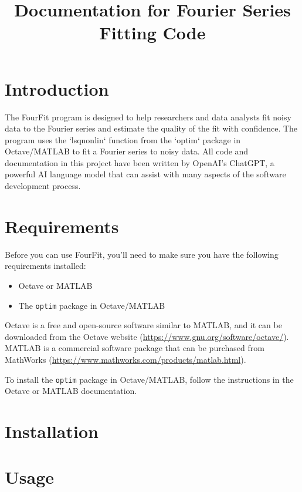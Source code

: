 \documentclass{article}
\begin{document}
\title{Documentation for Fourier Series Fitting Code}
\maketitle
\section{Introduction}
The FourFit program is designed to help researchers and data analysts fit noisy data to the Fourier series and estimate the quality of the fit with confidence. The program uses the `lsqnonlin` function from the `optim` package in Octave/MATLAB to fit a Fourier series to noisy data. All code and documentation in this project have been written by OpenAI's ChatGPT, a powerful AI language model that can assist with many aspects of the software development process.



\section{Requirements}
Before you can use FourFit, you'll need to make sure you have the following requirements installed:

\begin{itemize}
\item Octave or MATLAB
\item The \texttt{optim} package in Octave/MATLAB
\end{itemize}

Octave is a free and open-source software similar to MATLAB, and it can be downloaded from the Octave website (\url{https://www.gnu.org/software/octave/}). MATLAB is a commercial software package that can be purchased from MathWorks (\url{https://www.mathworks.com/products/matlab.html}).

To install the \texttt{optim} package in Octave/MATLAB, follow the instructions in the Octave or MATLAB documentation.

\section{Installation}

\section{Usage}
\end{document}
